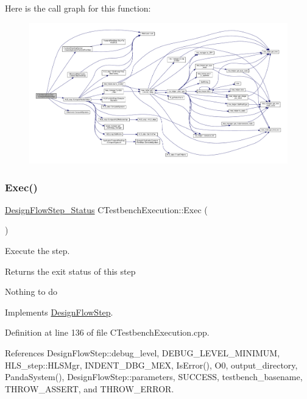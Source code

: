Here is the call graph for this function\+:
\nopagebreak
\begin{figure}[H]
\begin{center}
\leavevmode
\includegraphics[width=350pt]{db/dfb/classCTestbenchExecution_ac3b75ac39514d02be971318c2b9018e9_cgraph}
\end{center}
\end{figure}
\mbox{\label{classCTestbenchExecution_a8c357be38d34d8472d3ed3914ec14aef}} 
\subsubsection{\texorpdfstring{Exec()}{Exec()}}
{\footnotesize\ttfamily \hyperlink{design__flow__step_8hpp_afb1f0d73069c26076b8d31dbc8ebecdf}{Design\+Flow\+Step\+\_\+\+Status} C\+Testbench\+Execution\+::\+Exec (\begin{DoxyParamCaption}{ }\end{DoxyParamCaption})\hspace{0.3cm}{\ttfamily [virtual]}}



Execute the step. 

\begin{DoxyReturn}{Returns}
the exit status of this step 
\end{DoxyReturn}
Nothing to do 

Implements \hyperlink{classDesignFlowStep_a77d7e38493016766098711ea24f60b89}{Design\+Flow\+Step}.



Definition at line 136 of file C\+Testbench\+Execution.\+cpp.



References Design\+Flow\+Step\+::debug\+\_\+level, D\+E\+B\+U\+G\+\_\+\+L\+E\+V\+E\+L\+\_\+\+M\+I\+N\+I\+M\+UM, H\+L\+S\+\_\+step\+::\+H\+L\+S\+Mgr, I\+N\+D\+E\+N\+T\+\_\+\+D\+B\+G\+\_\+\+M\+EX, Is\+Error(), O0, output\+\_\+directory, Panda\+System(), Design\+Flow\+Step\+::parameters, S\+U\+C\+C\+E\+SS, testbench\+\_\+basename, T\+H\+R\+O\+W\+\_\+\+A\+S\+S\+E\+RT, and T\+H\+R\+O\+W\+\_\+\+E\+R\+R\+OR.

